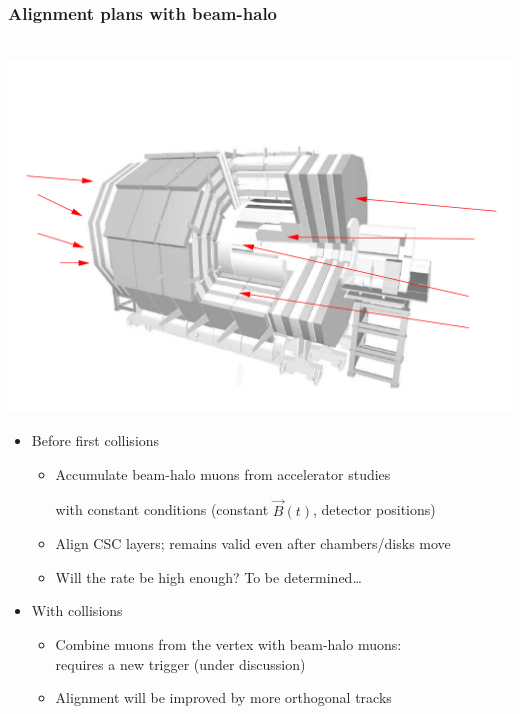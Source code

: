 \documentclass[compress]{beamer}
\begin{document}
\begin{frame}
\frametitle{Alignment plans with beam-halo}
\vspace{-1.75 cm}
\mbox{ } \hfill \includegraphics[width=4 cm]{beamhalo.pdf}

\vspace{-0.5 cm}
\begin{minipage}{1.05\linewidth}
\begin{itemize}\setlength{\itemsep}{0.5 cm}
\item Before first collisions

\vspace{0.1 cm}
\begin{itemize}\setlength{\itemsep}{0.3 cm}
\item Accumulate beam-halo muons from accelerator studies

with constant conditions (constant $\vec{B}(t)$, detector positions)
\item Align CSC layers; remains valid even after chambers/disks move
\item Will the rate be high enough?  To be determined\ldots
\end{itemize}

\item With collisions

\vspace{0.1 cm}
\begin{itemize}\setlength{\itemsep}{0.3 cm}
\item Combine muons from the vertex with beam-halo muons: \\ requires a new trigger (under discussion)

\item Alignment will be improved by more orthogonal tracks
\end{itemize}
\end{itemize}
\end{minipage}
\end{frame}

\end{document}
